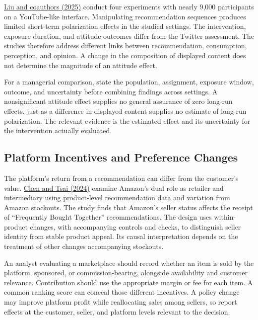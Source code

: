 \href{https://doi.org/10.1073/pnas.2318127122}{Liu and coauthors (2025)}
conduct four experiments with nearly 9,000 participants on a
YouTube-like interface. Manipulating recommendation sequences produces
limited short-term polarization effects in the studied settings. The
intervention, exposure duration, and attitude outcomes differ from the
Twitter assessment. The studies therefore address different links
between recommendation, consumption, perception, and opinion. A change
in the composition of displayed content does not determine the magnitude
of an attitude effect.

For a managerial comparison, state the population, assignment, exposure
window, outcome, and uncertainty before combining findings across
settings. A nonsignificant attitude effect supplies no general assurance
of zero long-run effects, just as a difference in displayed content
supplies no estimate of long-run polarization. The relevant evidence is
the estimated effect and its uncertainty for the intervention actually
evaluated.

\hypertarget{M08-platform-incentives-and-preference-changes}{%
\subsection{Platform Incentives and Preference
Changes}\label{M08-platform-incentives-and-preference-changes}}

\noindent The platform's return from a recommendation can differ from the
customer's value. \href{https://doi.org/10.1111/1756-2171.12481}{Chen
and Tsai (2024)} examine Amazon's dual role as retailer and intermediary
using product-level recommendation data and variation from Amazon
stockouts. The study finds that Amazon's seller status affects the
receipt of ``Frequently Bought Together'' recommendations. The design
uses within-product changes, with accompanying controls and checks, to
distinguish seller identity from stable product appeal. Its causal
interpretation depends on the treatment of other changes accompanying
stockouts.

An analyst evaluating a marketplace should record whether an item is
sold by the platform, sponsored, or commission-bearing, alongside
availability and customer relevance. Contribution should use the
appropriate margin or fee for each item. A common ranking score can
conceal those different incentives. A policy change may improve platform
profit while reallocating sales among sellers, so report effects at the
customer, seller, and platform levels relevant to the decision.

